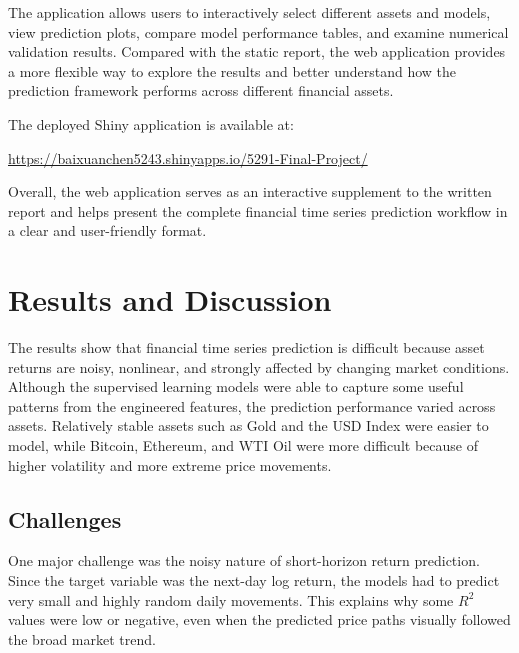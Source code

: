 \documentclass[12pt]{article}
\begin{document}
The application allows users to interactively select different assets and models, view prediction plots, compare model performance tables, and examine numerical validation results. Compared with the static report, the web application provides a more flexible way to explore the results and better understand how the prediction framework performs across different financial assets.

The deployed Shiny application is available at:

\begin{center}
\href{https://baixuanchen5243.shinyapps.io/5291-Final-Project/}
{https://baixuanchen5243.shinyapps.io/5291-Final-Project/}
\end{center}

Overall, the web application serves as an interactive supplement to the written report and helps present the complete financial time series prediction workflow in a clear and user-friendly format.



\section{Results and Discussion}

The results show that financial time series prediction is difficult because asset returns are noisy, nonlinear, and strongly affected by changing market conditions. Although the supervised learning models were able to capture some useful patterns from the engineered features, the prediction performance varied across assets. Relatively stable assets such as Gold and the USD Index were easier to model, while Bitcoin, Ethereum, and WTI Oil were more difficult because of higher volatility and more extreme price movements.

\subsection{Challenges}

One major challenge was the noisy nature of short-horizon return prediction. Since the target variable was the next-day log return, the models had to predict very small and highly random daily movements. This explains why some $R^2$ values were low or negative, even when the predicted price paths visually followed the broad market trend.
\end{document}
